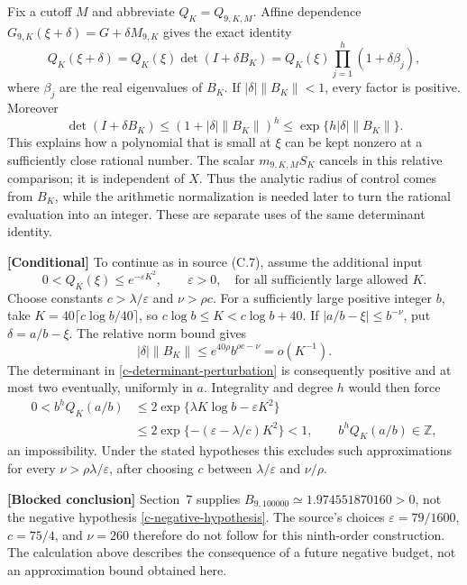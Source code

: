 Fix a cutoff $M$ and abbreviate $Q_K=Q_{9,K,M}$.  Affine dependence
$G_{9,K}(\xi+\delta)=G+\delta M_{9,K}$ gives the exact identity
\begin{equation}
 Q_K(\xi+\delta)=Q_K(\xi)\det(I+\delta B_K)
      =Q_K(\xi)\prod_{j=1}^{h}(1+\delta\beta_j),
 \label{c-determinant-perturbation}
\end{equation}
where $\beta_j$ are the real eigenvalues of $B_K$.  If
$|\delta|\|B_K\|<1$, every factor is positive.  Moreover
\[
 \det(I+\delta B_K)
 \leq(1+|\delta|\|B_K\|)^h
 \leq\exp\{h|\delta|\|B_K\|\}.
\]
This explains how a polynomial that is small at $\xi$ can be kept
nonzero at a sufficiently close rational number.
The scalar $m_{9,K,M}S_K$ cancels in this relative comparison; it is
independent of $X$.  Thus the analytic radius of control comes from
$B_K$, while the arithmetic normalization is needed later to turn the
rational evaluation into an integer.  These are separate uses of the
same determinant identity.

\noindent\textbf{[Conditional]} To continue as in source (C.7), assume
the additional input
\begin{equation}
 0<Q_K(\xi)\leq e^{-\varepsilon K^2},\qquad \varepsilon>0,
 \quad\text{for all sufficiently large allowed }K.
 \label{c-negative-hypothesis}
\end{equation}
Choose constants $c>\lambda/\varepsilon$ and $\nu>\rho c$.  For a
sufficiently large positive integer $b$, take
$K=40\lceil c\log b/40\rceil$, so $c\log b\leq K<c\log b+40$.
If $|a/b-\xi|\leq b^{-\nu}$, put $\delta=a/b-\xi$.  The relative norm
bound gives
\[
 |\delta|\|B_K\|\leq e^{40\rho}b^{\rho c-\nu}=o(K^{-1}).
\]
The determinant in \eqref{c-determinant-perturbation} is consequently
positive and at most two eventually, uniformly in $a$.  Integrality
and degree $h$ would then force
\begin{equation}
 \begin{aligned}
 0<b^hQ_K(a/b)
 &\leq2\exp\{\lambda K\log b-\varepsilon K^2\}\\
 &\leq2\exp\{-(\varepsilon-\lambda/c)K^2\}<1,
 \qquad b^hQ_K(a/b)\in\mathbb Z,
 \end{aligned}
 \label{c-rational-contradiction}
\end{equation}
an impossibility.  Under the stated hypotheses this excludes such
approximations for every $\nu>\rho\lambda/\varepsilon$, after choosing
$c$ between $\lambda/\varepsilon$ and $\nu/\rho$.

\noindent\textbf{[Blocked conclusion]} Section~7 supplies
$B_{9,100000}\simeq1.974551870160>0$, not the negative hypothesis
\eqref{c-negative-hypothesis}.  The source's choices
$\varepsilon=79/1600$, $c=75/4$, and $\nu=260$ therefore do not follow
for this ninth-order construction.  The calculation above describes
the consequence of a future negative budget, not an approximation
bound obtained here.

